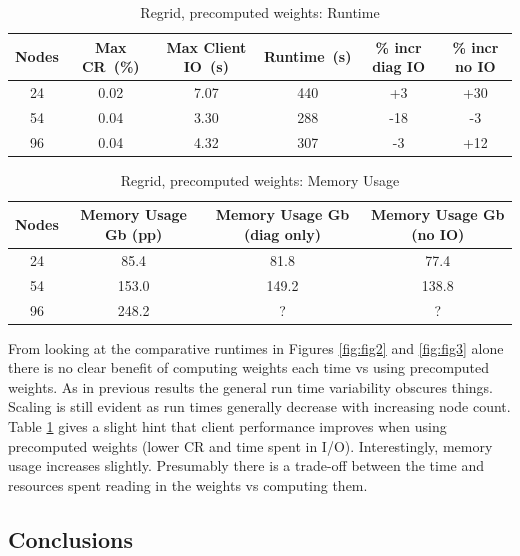 \begin{table}[ht!]
\scriptsize
  \begin{center}
    \caption{Regrid, precomputed weights: Runtime}
    \label{tab:table7}
     \begin{tabular}{|c|c|c|c|c|c|}
      \textbf{Nodes} & \textbf{Max CR~(\%)} & \textbf{Max Client IO~(s)} & \textbf{Runtime~(s)} & \textbf{\% incr diag IO} & \textbf{\% incr no IO}\\
      \hline
      24 & 0.02 & 7.07 & 440 & +3 & +30 \\
      54 & 0.04 & 3.30 & 288 & -18 & -3 \\
      96 & 0.04 & 4.32 & 307 & -3 & +12 \\
    \end{tabular}
  \end{center}
\end{table}

\begin{table}[ht!]
\scriptsize
  \begin{center}
    \caption{Regrid, precomputed weights: Memory Usage}
    \label{tab:table8}
     \begin{tabular}{|c|c|c|c|}
      \textbf{Nodes} & \textbf{Memory Usage Gb (pp) } & \textbf{Memory Usage Gb (diag only)} & \textbf{Memory Usage Gb (no IO)} \\
      \hline
      24 & 85.4 & 81.8 & 77.4 \\
      54 & 153.0 & 149.2 & 138.8 \\
      96 & 248.2 & ? & ? \\
    \end{tabular}
  \end{center}
\end{table}

\normalsize

From looking at the comparative runtimes in Figures \ref{fig:fig2} and \ref{fig:fig3} alone there is no clear benefit of computing weights each time vs using precomputed weights. As in previous results the general run time variability obscures things. Scaling is still evident as run times generally decrease with
increasing node count. Table \ref{tab:table7} gives a slight hint that client performance improves when using precomputed weights (lower CR and time spent in I/O).
Interestingly, memory usage increases slightly. Presumably there is a trade-off between the time and resources spent reading in the weights vs computing them.

\subsection{Conclusions}

